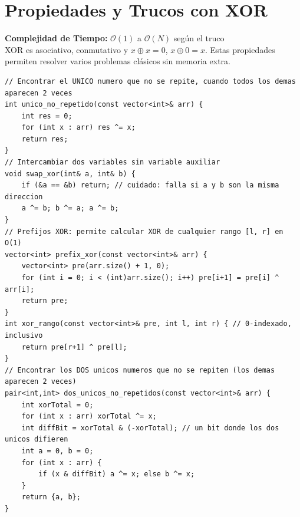 \documentclass[10pt,twocolumn,letterpaper]{report}
\begin{document}
\section{Propiedades y Trucos con XOR}
\textbf{Complejidad de Tiempo:} $\mathcal{O}(1)$ a $\mathcal{O}(N)$ según el truco \\
XOR es asociativo, conmutativo y $x \oplus x = 0$, $x \oplus 0 = x$. Estas propiedades permiten resolver varios problemas clásicos sin memoria extra.
\begin{lstlisting}
// Encontrar el UNICO numero que no se repite, cuando todos los demas aparecen 2 veces
int unico_no_repetido(const vector<int>& arr) {
    int res = 0;
    for (int x : arr) res ^= x;
    return res;
}
// Intercambiar dos variables sin variable auxiliar
void swap_xor(int& a, int& b) {
    if (&a == &b) return; // cuidado: falla si a y b son la misma direccion
    a ^= b; b ^= a; a ^= b;
}
// Prefijos XOR: permite calcular XOR de cualquier rango [l, r] en O(1)
vector<int> prefix_xor(const vector<int>& arr) {
    vector<int> pre(arr.size() + 1, 0);
    for (int i = 0; i < (int)arr.size(); i++) pre[i+1] = pre[i] ^ arr[i];
    return pre;
}
int xor_rango(const vector<int>& pre, int l, int r) { // 0-indexado, inclusivo
    return pre[r+1] ^ pre[l];
}
// Encontrar los DOS unicos numeros que no se repiten (los demas aparecen 2 veces)
pair<int,int> dos_unicos_no_repetidos(const vector<int>& arr) {
    int xorTotal = 0;
    for (int x : arr) xorTotal ^= x;
    int diffBit = xorTotal & (-xorTotal); // un bit donde los dos unicos difieren
    int a = 0, b = 0;
    for (int x : arr) {
        if (x & diffBit) a ^= x; else b ^= x;
    }
    return {a, b};
}
\end{lstlisting}
\end{document}
